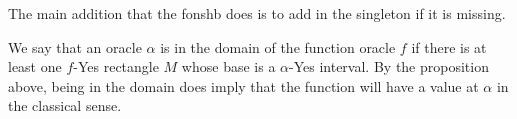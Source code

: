 \documentclass[12pt]{article}
\begin{document}
The main addition that the fonshb does is to add in the singleton if it is missing. 

We say that an oracle $\alpha$ is in the domain of the function oracle $f$ if there is at least one $f$-Yes rectangle $M$ whose base is a $\alpha$-Yes interval. By the proposition above, being in the domain does imply that the function will have a value at $\alpha$ in the classical sense. 




\medskip

\normalem %
\printbibliography
\end{document}
